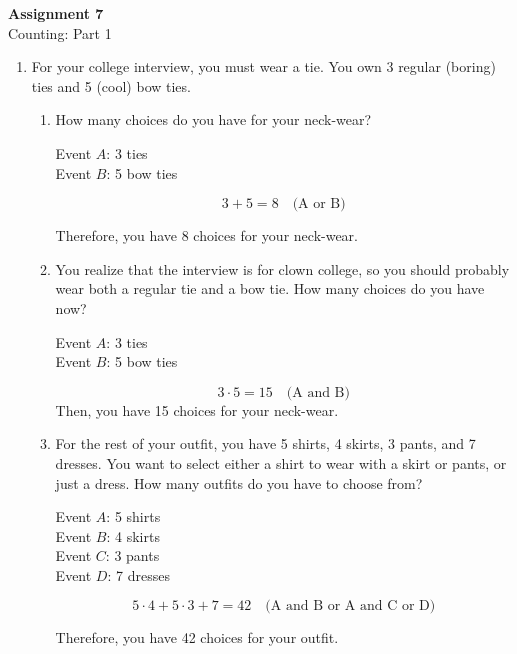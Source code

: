 \documentclass[11pt, letterpaper, includehead]{article}
\theoremstyle{plain}
\theoremstyle{mydefinition}
\theoremstyle{myproperty}
\begin{document}
 

\pagestyle{fancy}
\fancyhead{}
\fancyfoot{}


\begin{center}
    \Large{\textbf{Assignment 7}}\\
    \Large{Counting: Part 1}
\end{center}

\begin{enumerate}[label=\textbf{\arabic*}., leftmargin=*]
\item For your college interview, you must wear a tie. You own 3 regular (boring) ties and 5 (cool) bow ties.
\begin{enumerate}[label=(\alph*)]
    \item How many choices do you have for your neck-wear?

    Event $A$: 3 ties \\
    Event $B$: 5 bow ties

    \[
    3 + 5 = 8 \quad \text{(A or B)}
    \]

    Therefore, you have 8 choices for your neck-wear.

    \item You realize that the interview is for clown college, so you should probably wear both a regular tie and a bow tie. How many choices do you have now?
    
    Event $A$: 3 ties \\
    Event $B$: 5 bow ties

    \[
    3 \cdot 5 = 15 \quad \text{(A and B)}
    \]
    Then, you have 15 choices for your neck-wear.
    \item For the rest of your outfit, you have 5 shirts, 4 skirts, 3 pants, and 7 dresses. You want to select either a shirt to wear with a skirt or pants, or just a dress. How many outfits do you have to choose from?

    Event $A$: 5 shirts \\
    Event $B$: 4 skirts \\
    Event $C$: 3 pants \\
    Event $D$: 7 dresses

    \[
    5 \cdot 4 + 5 \cdot 3 + 7 =  42\quad \text{(A and B or A and C or D)}
    \]

    Therefore, you have 42 choices for your outfit.
\end{enumerate}


\end{enumerate}
\end{document}
